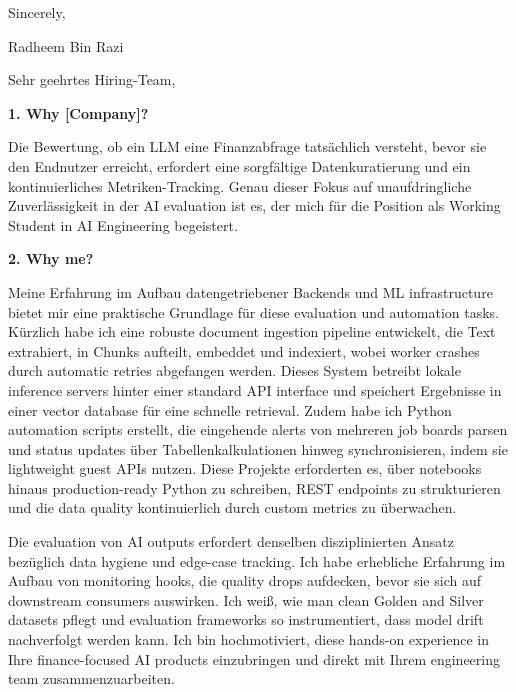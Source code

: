 \documentclass[11pt,a4paper]{coverletter}
\begin{document}
\closing{Sincerely,}{Radheem Bin Razi}

\clearpage
{}


\opening{Sehr geehrtes Hiring-Team,}

\vspace{8pt}\noindent\textbf{1. Why [Company]?}\par\vspace{3pt}

Die Bewertung, ob ein LLM eine Finanzabfrage tatsächlich versteht, bevor sie den Endnutzer erreicht, erfordert eine sorgfältige Datenkuratierung und ein kontinuierliches Metriken-Tracking. Genau dieser Fokus auf unaufdringliche Zuverlässigkeit in der AI evaluation ist es, der mich für die Position als Working Student in AI Engineering begeistert.

\vspace{8pt}\noindent\textbf{2. Why me?}\par\vspace{3pt}

Meine Erfahrung im Aufbau datengetriebener Backends und ML infrastructure bietet mir eine praktische Grundlage für diese evaluation und automation tasks. Kürzlich habe ich eine robuste document ingestion pipeline entwickelt, die Text extrahiert, in Chunks aufteilt, embeddet und indexiert, wobei worker crashes durch automatic retries abgefangen werden. Dieses System betreibt lokale inference servers hinter einer standard API interface und speichert Ergebnisse in einer vector database für eine schnelle retrieval. Zudem habe ich Python automation scripts erstellt, die eingehende alerts von mehreren job boards parsen und status updates über Tabellenkalkulationen hinweg synchronisieren, indem sie lightweight guest APIs nutzen. Diese Projekte erforderten es, über notebooks hinaus production-ready Python zu schreiben, REST endpoints zu strukturieren und die data quality kontinuierlich durch custom metrics zu überwachen.

Die evaluation von AI outputs erfordert denselben disziplinierten Ansatz bezüglich data hygiene und edge-case tracking. Ich habe erhebliche Erfahrung im Aufbau von monitoring hooks, die quality drops aufdecken, bevor sie sich auf downstream consumers auswirken. Ich weiß, wie man clean Golden and Silver datasets pflegt und evaluation frameworks so instrumentiert, dass model drift nachverfolgt werden kann. Ich bin hochmotiviert, diese hands-on experience in Ihre finance-focused AI products einzubringen und direkt mit Ihrem engineering team zusammenzuarbeiten.
\end{document}
